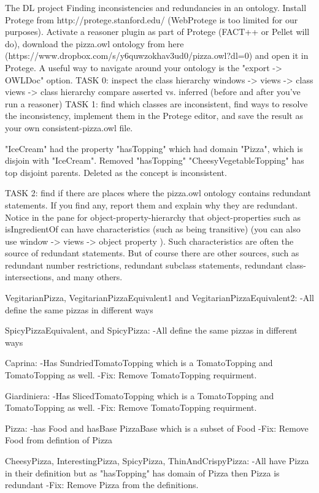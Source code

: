 The DL project
Finding inconsistencies and redundancies in an ontology.
Install Protege from http://protege.stanford.edu/ (WebProtege is too limited for our purposes). Activate a reasoner plugin as part of Protege (FACT++ or Pellet will do), download the pizza.owl ontology from here (https://www.dropbox.com/s/y6quwzokhav3ud0/pizza.owl?dl=0) and open it in Protege. A useful way to navigate around your ontology is the "export -> OWLDoc" option.
TASK 0: inspect the class hierarchy windows -> views -> class views -> class hierarchy compare asserted vs. inferred (before and after you've run a reasoner)
TASK 1: find which classes are inconsistent, find ways to resolve the inconsistency, implement them in the Protege editor, and save the result as your own consistent-pizza.owl file.

"IceCream" had the property "hasTopping" which had domain "Pizza", which is disjoin with "IceCream". Removed "hasTopping"
"CheesyVegetableTopping" has top disjoint parents. Deleted as the concept is inconsistent.

TASK 2: find if there are places where the pizza.owl ontology contains redundant statements. If you find any, report them and explain why they are redundant. Notice in the pane for object-property-hierarchy that object-properties such as isIngredientOf can have characteristics (such as being transitive) (you can also use window -> views -> object property ). Such characteristics are often the source of redundant statements. But of course there are other sources, such as redundant number restrictions, redundant subclass statements, redundant class-intersections, and many others.

VegitarianPizza, VegitarianPizzaEquivalent1 and VegitarianPizzaEquivalent2:
-All define the same pizzas in different ways

SpicyPizzaEquivalent, and SpicyPizza:
-All define the same pizzas in different ways

Caprina:
-Has SundriedTomatoTopping which is a TomatoTopping and TomatoTopping as well.
-Fix:
  Remove TomatoTopping requirment.

Giardiniera:
-Has SlicedTomatoTopping which is a TomatoTopping and TomatoTopping as well.
-Fix:
  Remove TomatoTopping requirment.

Pizza:
-has Food and hasBase PizzaBase which is a subset of Food
-Fix:
  Remove Food from defintion of Pizza

CheesyPizza, InterestingPizza, SpicyPizza, ThinAndCrispyPizza:
-All have Pizza in their definition but as "hasTopping" has domain of Pizza then Pizza is redundant
-Fix:
  Remove Pizza from the definitions.

